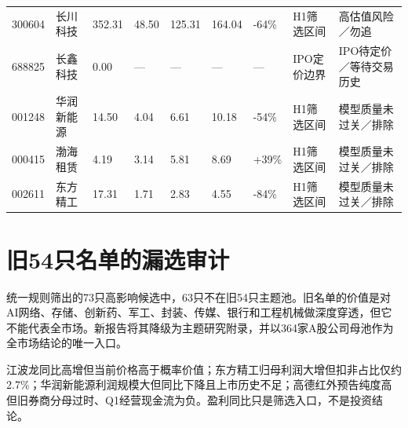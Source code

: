 \begin{longtable}{L{1.05cm}L{1.55cm}R{0.95cm}R{0.95cm}R{1.05cm}R{0.95cm}R{0.95cm}L{2.15cm}L{2.55cm}}
300604 & 长川科技 & 352.31 & 48.50 & 125.31 & 164.04 & -64\% & H1筛选区间 & 高估值风险／勿追 \\
688825 & 长鑫科技 & 0.00 & --- & --- & --- & --- & IPO定价边界 & IPO待定价／等待交易历史 \\
001248 & 华润新能源 & 14.50 & 4.04 & 6.61 & 10.18 & -54\% & H1筛选区间 & 模型质量未过关／排除 \\
000415 & 渤海租赁 & 4.19 & 3.14 & 5.81 & 8.69 & +39\% & H1筛选区间 & 模型质量未过关／排除 \\
002611 & 东方精工 & 17.31 & 1.71 & 2.83 & 4.55 & -84\% & H1筛选区间 & 模型质量未过关／排除 \\
\bottomrule
\end{longtable}
\normalsize
{}

\section{旧54只名单的漏选审计}

统一规则筛出的73只高影响候选中，63只不在旧54只主题池。旧名单的价值是对AI网络、存储、创新药、军工、封装、传媒、银行和工程机械做深度穿透，但它不能代表全市场。新报告将其降级为主题研究附录，并以364家A股公司母池作为全市场结论的唯一入口。

\begin{riskbox}[为什么不能把高同比直接变成买入]
江波龙同比高增但当前价格高于概率价值；东方精工归母利润大增但扣非占比仅约2.7\%；华润新能源利润规模大但同比下降且上市历史不足；高德红外预告纯度高但旧券商分母过时、Q1经营现金流为负。盈利同比只是筛选入口，不是投资结论。
\end{riskbox}
